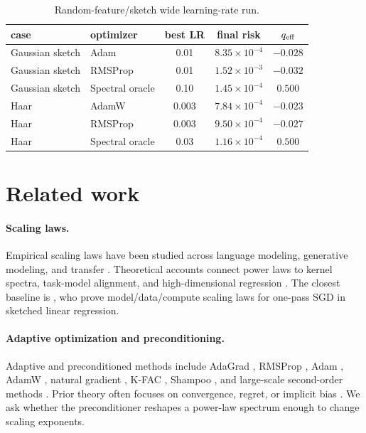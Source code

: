 \documentclass{article}
\begin{document}
\begin{table}[t]
\centering
\caption{Random-feature/sketch wide learning-rate run.}
\label{tab:randomfeatures}
\begin{tabular}{llccc}
\toprule
case & optimizer & best LR & final risk & $q_{\rm eff}$ \\
\midrule
Gaussian sketch & Adam & 0.01 & $8.35\times10^{-4}$ & $-0.028$ \\
Gaussian sketch & RMSProp & 0.01 & $1.52\times10^{-3}$ & $-0.032$ \\
Gaussian sketch & Spectral oracle & 0.10 & $1.45\times10^{-4}$ & $0.500$ \\
Haar & AdamW & 0.003 & $7.84\times10^{-4}$ & $-0.023$ \\
Haar & RMSProp & 0.003 & $9.50\times10^{-4}$ & $-0.027$ \\
Haar & Spectral oracle & 0.03 & $1.16\times10^{-4}$ & $0.500$ \\
\bottomrule
\end{tabular}
\end{table}

\section{Related work}
\paragraph{Scaling laws.} Empirical scaling laws have been studied across language modeling, generative modeling, and transfer \citep{hestness2017deep,rosenfeld2019constructive,kaplan2020scaling,henighan2020scaling,hernandez2021scaling,hoffmann2022training}.  Theoretical accounts connect power laws to kernel spectra, task-model alignment, and high-dimensional regression \citep{bordelon2020spectrum,canatar2021spectral,bahri2021explaining,lin2024scaling}.  The closest baseline is \citet{lin2024scaling}, who prove model/data/compute scaling laws for one-pass SGD in sketched linear regression.

\paragraph{Adaptive optimization and preconditioning.} Adaptive and preconditioned methods include AdaGrad \citep{duchi2011adaptive}, RMSProp \citep{tieleman2012rmsprop}, Adam \citep{kingma2015adam}, AdamW \citep{loshchilov2019decoupled}, natural gradient \citep{amari1998natural}, K-FAC \citep{martens2015optimizing}, Shampoo \citep{gupta2018shampoo}, and large-scale second-order methods \citep{anil2020scalable}.  Prior theory often focuses on convergence, regret, or implicit bias \citep{reddi2018convergence,wilson2017marginal}.  We ask whether the preconditioner reshapes a power-law spectrum enough to change scaling exponents.
\end{document}
